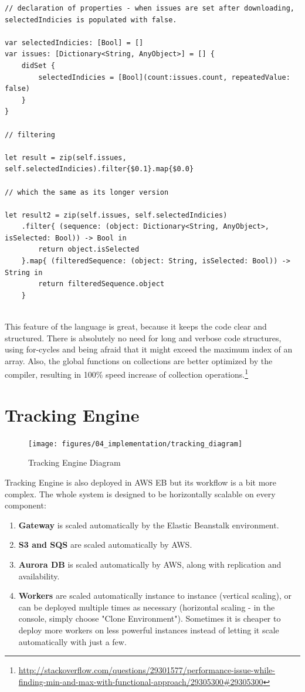 \begin{lstlisting}
// declaration of properties - when issues are set after downloading, selectedIndicies is populated with false.

var selectedIndicies: [Bool] = []
var issues: [Dictionary<String, AnyObject>] = [] {
    didSet {
        selectedIndicies = [Bool](count:issues.count, repeatedValue: false)
    }
}

// filtering

let result = zip(self.issues, self.selectedIndicies).filter{$0.1}.map{$0.0}

// which the same as its longer version

let result2 = zip(self.issues, self.selectedIndicies)
	.filter{ (sequence: (object: Dictionary<String, AnyObject>, isSelected: Bool)) -> Bool in
		return object.isSelected
	}.map{ (filteredSequence: (object: String, isSelected: Bool)) -> String in
		return filteredSequence.object
	}


\end{lstlisting}

\bigbreak

This feature of the language is great, because it keeps the code clear and structured. There is absolutely no need for long and verbose code structures, using for-cycles and being afraid that it might exceed the maximum index of an array. Also, the global functions on collections are better optimized by the compiler, resulting in 100\% speed increase of collection operations.\footnote{\url{http://stackoverflow.com/questions/29301577/performance-issue-while-finding-min-and-max-with-functional-approach/29305300\#29305300}}

\newpage

\section{Tracking Engine}

\begin{figure}[!ht]
	\centering
	\texttt{[image: figures/04\_implementation/tracking\_diagram]}
    \caption{Tracking Engine Diagram}
\end{figure}

Tracking Engine is also deployed in AWS EB but its workflow is a bit more complex. The whole system is designed to be horizontally scalable on every component:

\begin{enumerate}
	\item {\bf Gateway} is scaled automatically by the Elastic Beanstalk environment.
	\item {\bf S3 and SQS} are scaled automatically by AWS.
	\item {\bf Aurora DB} is scaled automatically by AWS, along with replication and availability.
	\item {\bf Workers} are scaled automatically instance to instance (vertical scaling), or can be deployed multiple times as necessary (horizontal scaling - in the console, simply choose "Clone Environment"). Sometimes it is cheaper to deploy more workers on less powerful instances instead of letting it scale automatically with just a few.
\end{enumerate}

